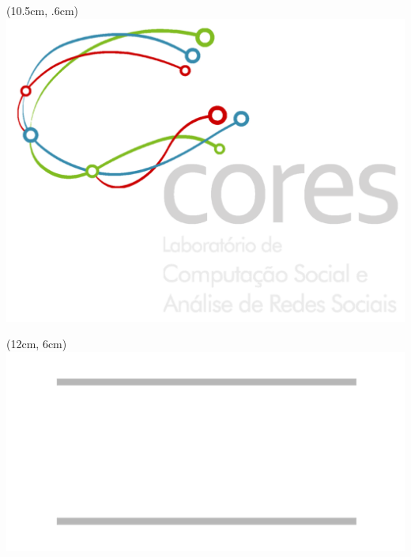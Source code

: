\documentclass[aspectratio=169,10pt,xcolor={dvipsnames}]{beamer}
\begin{document}
{\begin{frame}
        \begin{textblock*}{\textwidth}(10.5cm, .6cm)
            \includegraphics[scale=.225]{./Graphics/logo_lab_fundopreto.png}
        \end{textblock*}

        \begin{textblock*}{\textwidth}(12cm, 6cm)
          \includegraphics[scale=.225]{./Graphics/ibm_research_logo.png}
        \end{textblock*}


\end{frame}}
\end{document}
